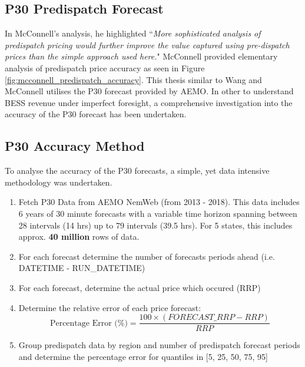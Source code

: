 \subsection{ P30 Predispatch Forecast  }
In McConnell's analysis, he highlighted ``\textit{More sophisticated analysis of predispatch pricing would further improve the value captured using pre-dispatch prices than the simple approach used here.}" McConnell provided elementary analysis of predispatch price accuracy as seen in Figure \ref{fig:mcconnell_predispatch_accuracy}.
\newline
This thesis similar to Wang and McConnell utilises the P30 forecast provided by AEMO. In other to understand BESS revenue under imperfect foresight, a comprehensive investigation into the accuracy of the P30 forecast has been undertaken.
\subsection{P30 Accuracy Method}
To analyse the accuracy of the P30 forecasts, a simple, yet data intensive methodology was undertaken. 
\begin{enumerate}
    \item Fetch P30 Data from AEMO NemWeb (from 2013 - 2018). This data includes 6 years of 30 minute forecasts with a variable time horizon spanning between 28 intervals (14 hrs) up to 79 intervals (39.5 hrs). For 5 states, this includes approx. \textbf{40 million} rows of data. 
    \item For each forecast determine the number of forecasts periods ahead (i.e. DATETIME - RUN\_DATETIME)
    \item For each forecast, determine the actual price which occured (RRP)
    \item Determine the relative error of each price forecast:
    \begin{equation}
        \text{Percentage Error (\%)} = \dfrac{100 \times (FORECAST\_RRP - RRP)}{RRP}
    \end{equation}
    \item Group predispatch data by region and number of predispatch forecast periods and determine the percentage error for quantiles in [5, 25, 50, 75, 95]  
\end{enumerate}
